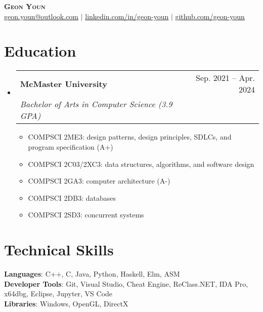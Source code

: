 \documentclass[letterpaper,11pt]{article}
\makeatletter
\newcommand{\resumeItem}[1]{
  \item\small{
    {#1 \vspace{-2pt}}
  }
}
\newcommand{\resumeSubheading}[4]{
  \vspace{-2pt}\item
    \begin{tabular*}{0.97\textwidth}[t]{l@{\extracolsep{\fill}}r}
      \textbf{#1} & #2 \\
      \textit{\small#3} & \textit{\small #4} \\
    \end{tabular*}\vspace{-7pt}
}
\newcommand{\resumeSubHeadingListStart}{\begin{itemize}[leftmargin=0.15in, label={}]}
\newcommand{\resumeSubHeadingListEnd}{\end{itemize}}
\newcommand{\resumeItemListStart}{\begin{itemize}}
\newcommand{\resumeItemListEnd}{\end{itemize}\vspace{-5pt}}
\makeatother
\begin{document}
\begin{center}
	\textbf{\Huge \scshape Geon Youn} \\ \vspace{1pt}
	\small \href{mailto:geon.youn@outlook.com}{\underline{geon.youn@outlook.com}} $|$ 
	\href{https://linkedin.com/in/geon-youn}{\underline{linkedin.com/in/geon-youn}} $|$
	\href{https://github.com/geon-youn}{\underline{github.com/geon-youn}}
\end{center}

\section{Education}
\resumeSubHeadingListStart
	\resumeSubheading
		{McMaster University}{Sep. 2021 -- Apr. 2024}
		{Bachelor of Arts in Computer Science (3.9 GPA)}{}
	\resumeItemListStart
		\resumeItem{COMPSCI 2ME3: design patterns, design principles, SDLCs, and program specification (A+)}
		\resumeItem{COMPSCI 2C03/2XC3: data structures, algorithms, and software design}
		\resumeItem{COMPSCI 2GA3: computer architecture (A-)}
		\resumeItem{COMPSCI 2DB3: databases}
		\resumeItem{COMPSCI 2SD3: concurrent systems}
	\resumeItemListEnd
\resumeSubHeadingListEnd
  
\section{Technical Skills}
\begin{itemize}[leftmargin=0.15in, label={}]
	\small{\item{
		\textbf{Languages}{: C++, C, Java, Python, Haskell, Elm, ASM} \\
		\textbf{Developer Tools}{: Git, Visual Studio, Cheat Engine, ReClass.NET, IDA Pro, x64dbg, Eclipse, Jupyter, VS Code} \\
		\textbf{Libraries}{: Windows, OpenGL, DirectX}
    }}
\end{itemize}

%
      
\end{document}

